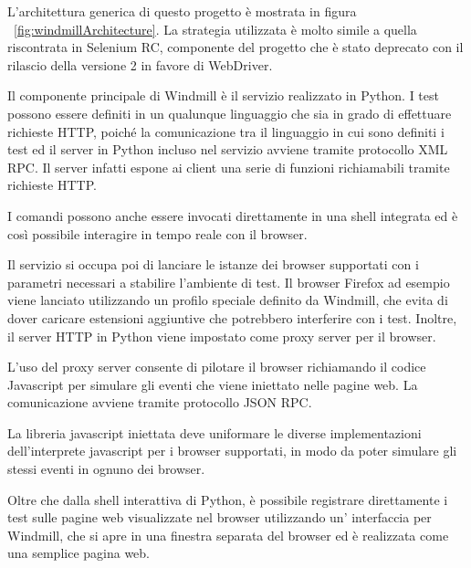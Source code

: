 L'architettura generica di questo progetto è mostrata in figura ~\ref{fig:windmillArchitecture}. La strategia utilizzata è molto simile a quella riscontrata in Selenium RC, componente del progetto che è stato deprecato con il rilascio della versione 2 in favore di WebDriver. 

Il componente principale di Windmill è il servizio realizzato in Python. I test possono essere definiti in un qualunque linguaggio che sia in grado di effettuare richieste HTTP, poiché la comunicazione tra il linguaggio in cui sono definiti i test ed il server in Python incluso nel servizio avviene tramite protocollo XML RPC. Il server infatti espone ai client una serie di funzioni richiamabili tramite richieste HTTP.

I comandi possono anche essere invocati direttamente in una shell integrata ed è così possibile interagire in tempo reale con il browser.

Il servizio si occupa poi di lanciare le istanze dei browser supportati con i parametri necessari a stabilire l'ambiente di test. Il browser Firefox ad esempio viene lanciato utilizzando un profilo speciale definito da Windmill, che evita di dover caricare estensioni aggiuntive che potrebbero interferire con i test. Inoltre, il server HTTP in Python viene impostato come proxy server per il browser.

L'uso del proxy server consente di pilotare il browser richiamando il codice Javascript per simulare gli eventi che viene iniettato nelle pagine web. La comunicazione avviene tramite protocollo JSON RPC.

La libreria javascript iniettata deve uniformare le diverse implementazioni dell'interprete javascript per i browser supportati, in modo da poter simulare gli stessi eventi in ognuno dei browser. 

Oltre che dalla shell interattiva di Python, è possibile registrare direttamente i test sulle pagine web visualizzate nel browser utilizzando un' interfaccia per Windmill, che si apre in una finestra separata del browser ed è realizzata come una semplice pagina web.

